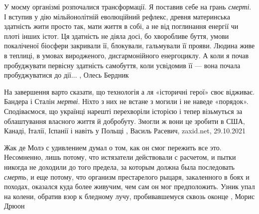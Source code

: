 У моєму організмі розпочалися трансформації. Я поставив себе на грань \emph{смерті}. І
вступив у дію мільйонолітній еволюційний рефлекс, древня материнська здатність
жити просто так, мати життя в собі, а не від поглинання енергії чи плоті інших
істот. Ця здатність не діяла досі, бо хворобливе буття, умови покаліченої
біосфери закривали її, блокували, гальмували її прояви. Людина живе в теплиці,
в умовах виродженого, дисгармонійного енергоциклу. А коли я почав пробуджувати
первісну здатність самобуття, коли усвідомив її — вона почала пробуджуватися до
дії...
, Олесь Бердник

На завершення варто сказати, що технологія а ля «історичні герої» своє
відживає. Бандера і Сталін \emph{мертві}. Ніхто з них не встане з могили і не наведе
«порядок». Сподіваємося, що українці нарешті перехворіли історією і тепер
візьмуться за облаштування власного життя й добробуту. Змогли ж вони це зробити
в США, Канаді, Італії, Іспанії і навіть у Польщі
, 
Василь Расевич, zaxid.net, 29.10.2021

Жак де Молэ с удивлением думал о том, как он  смог  пережить  все  это.
Несомненно, лишь потому, что истязатели действовали с  расчетом,  и  пытки
никогда не доходили до того предела, за которым  должна  была  последовать
\emph{смерть}, и еще потому, что организм престарелого рыцаря, закаленного в боях и
походах, оказался куда более живучим, чем сам он мог предположить.  Узник упал
на колени, обратив  взор  к  бледному  лучу,  пробивавшемуся сквозь оконце
, Морис Дрюон
